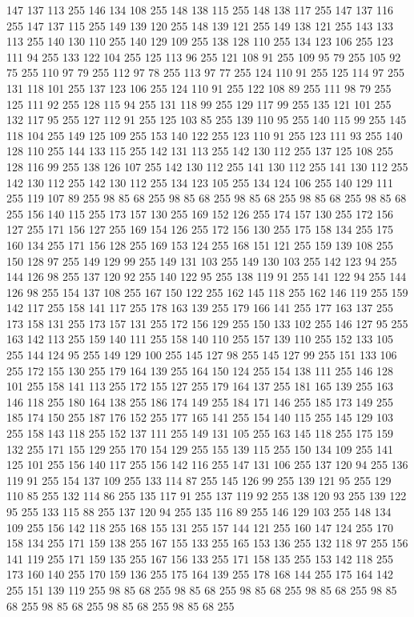 147 137 113 255 146 134 108 255 148 138 115 255 148 138 117 255 147 137 116 255 147 137 115 255 149 139 120 255 148 139 121 255 149 138 121 255 143 133 113 255 140 130 110 255 140 129 109 255 138 128 110 255 134 123 106 255 123 111 94 255 133 122 104 255 125 113 96 255 121 108 91 255 109 95 79 255 105 92 75 255 110 97 79 255 112 97 78 255 113 97 77 255 124 110 91 255 125 114 97 255 131 118 101 255 137 123 106 255 124 110 91 255 122 108 89 255 111 98 79 255 125 111 92 255 128 115 94 255 131 118 99 255 129 117 99 255 135 121 101 255 132 117 95 255 127 112 91 255 125 103 85 255 139 110 95 255 140 115 99 255 145 118 104 255 149 125 109 255 153 140 122 255 123 110 91 255 123 111 93 255 140 128 110 255 144 133 115 255 142 131 113 255 142 130 112 255 137 125 108 255 128 116 99 255 138 126 107 255 142 130 112 255 141 130 112 255 141 130 112 255 142 130 112 255 142 130 112 255 134 123 105 255 134 124 106 255 140 129 111 255 119 107 89 255 98 85 68 255 98 85 68 255 98 85 68 255
98 85 68 255 98 85 68 255 156 140 115 255 173 157 130 255 169 152 126 255 174 157 130 255 172 156 127 255 171 156 127 255 169 154 126 255 172 156 130 255 175 158 134 255 175 160 134 255 171 156 128 255 169 153 124 255 168 151 121 255 159 139 108 255 150 128 97 255 149 129 99 255 149 131 103 255 149 130 103 255 142 123 94 255 144 126 98 255 137 120 92 255 140 122 95 255 138 119 91 255 141 122 94 255 144 126 98 255 154 137 108 255 167 150 122 255 162 145 118 255 162 146 119 255 159 142 117 255 158 141 117 255 178 163 139 255 179 166 141 255 177 163 137 255 173 158 131 255 173 157 131 255 172 156 129 255 150 133 102 255 146 127 95 255 163 142 113 255 159 140 111 255 158 140 110 255 157 139 110 255 152 133 105 255 144 124 95 255 149 129 100 255 145 127 98 255 145 127 99 255 151 133 106 255 172 155 130 255 179 164 139 255 164 150 124 255 154 138 111 255 146 128 101 255 158 141 113 255 172 155 127 255 179 164 137 255 181 165 139 255 163 146 118 255 180 164 138 255 186 174 149 255 184 171 146 255
185 173 149 255 185 174 150 255 187 176 152 255 177 165 141 255 154 140 115 255 145 129 103 255 158 143 118 255 152 137 111 255 149 131 105 255 163 145 118 255 175 159 132 255 171 155 129 255 170 154 129 255 155 139 115 255 150 134 109 255 141 125 101 255 156 140 117 255 156 142 116 255 147 131 106 255 137 120 94 255 136 119 91 255 154 137 109 255 133 114 87 255 145 126 99 255 139 121 95 255 129 110 85 255 132 114 86 255 135 117 91 255 137 119 92 255 138 120 93 255 139 122 95 255 133 115 88 255 137 120 94 255 135 116 89 255 146 129 103 255 148 134 109 255 156 142 118 255 168 155 131 255 157 144 121 255 160 147 124 255 170 158 134 255 171 159 138 255 167 155 133 255 165 153 136 255 132 118 97 255 156 141 119 255 171 159 135 255 167 156 133 255 171 158 135 255 153 142 118 255 173 160 140 255 170 159 136 255 175 164 139 255 178 168 144 255 175 164 142 255 151 139 119 255 98 85 68 255 98 85 68 255 98 85 68 255 98 85 68 255 98 85 68 255 98 85 68 255 98 85 68 255 98 85 68 255
